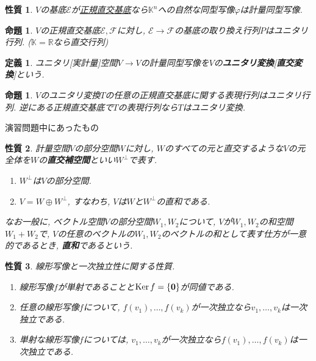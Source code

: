 \documentclass[a4j,dvipdfmx]{jsarticle}
\newcommand{\R}{\mathbb{R}}
\newcommand{\K}{\mathbb{K}}
\newcommand{\Ker}{\mathrm{Ker}\hspace{0.5mm}}
\newcommand{\E}{\mathcal{E}}
\newcommand{\F}{\mathcal{F}}
\newcommand{\Slash}{\hrulefill 演習問題中にあったもの \hrulefill}
\theoremstyle{mystyle}
\newtheorem*{definition}{定義}
\newtheorem{proposition}[theorem]{命題}
\newtheorem*{property}{性質}
\begin{document}
    \begin{property}
        $V$の基底$\E$が\underline{正規直交基底}なら$\K^n$への自然な同型写像$\varphi$は計量同型写像.
    \end{property}
    \begin{proposition}
        $V$の正規直交基底$\E,\F$に対し, $\E\to\F$の基底の取り換え行列$P$はユニタリ行列. ($\K=\R$なら直交行列)
    \end{proposition}
    \begin{definition}
        ユニタリ[実計量]空間$V\to V$の計量同型写像を$V$の\textbf{ユニタリ変換}[\textbf{直交変換}]という.
    \end{definition}
    \begin{proposition}
        $V$のユニタリ変換$T$の任意の正規直交基底に関する表現行列はユニタリ行列. 逆にある正規直交基底で$T$の表現行列なら$T$はユニタリ変換.
    \end{proposition}
    \Slash
    \begin{property}
        計量空間$V$の部分空間$W$に対し, $W$のすべての元と直交するような$V$の元全体を$W$の\textbf{直交補空間}といい$W^{\bot}$で表す.
        \begin{enumerate}
            \item $W^{\bot}$は$V$の部分空間.
            \item $V=W\oplus W^{\bot}$, すなわち, $V$は$W$と$W^{\bot}$の直和である. 
        \end{enumerate}
        なお一般に, ベクトル空間$V$の部分空間$W_1,W_2$について, $V$が$W_1,W_2$の和空間$W_1+W_2$で, $V$の任意のベクトルの$W_1,W_2$のベクトルの和として表す仕方が一意的であるとき, \textbf{直和}であるという.
    \end{property}
    \begin{property}
        線形写像と一次独立性に関する性質.
        \begin{enumerate}
            \item 線形写像$f$が単射であることと$\Ker f=\{\bm{0}\}$が同値である.
            \item 任意の線形写像$f$について, $f(v_1),\dots,f(v_k)$が一次独立なら$v_1,\dots,v_k$は一次独立である.
            \item 単射な線形写像$f$については, $v_1,\dots,v_k$が一次独立なら$f(v_1),\dots,f(v_k)$は一次独立である.
        \end{enumerate}
    \end{property}
    \clearpage
\end{document}
